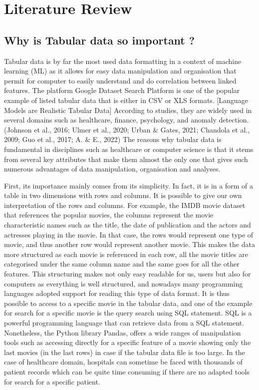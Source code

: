 \chapter{Literature Review}


\section{Why is Tabular data so important ?}

Tabular data is by far the most used data formatting in a context of machine learning (ML) as it allows for easy data manipulation and organisation that permit for computer to easily understand and do correlation between linked features. The platform Google Dataset Search Platform is one of the popular example of listed tabular data that is either in CSV or XLS formats. [Language Models are Realistic Tabular Data] According to studies, they are widely used in several domains such as healthcare, finance, psychology, and anomaly detection. (Johnson et al.,
 2016; Ulmer et al., 2020; Urban \& Gates, 2021; Chandola
 et al., 2009; Guo et al., 2017; A. \& E., 2022) 
The reasons why tabular data is fundamental in disciplines such as healthcare or computer science is that it stems from several key attributes that make them almost the only one that gives such numerous advantages of data manipulation, organisation and analyses. 

First, its importance mainly comes from its simplicity. In fact, it is in a form of a table in two dimensions with rows and columns. It is possible to give our own interpretation of the rows and columns. For example, the IMDB movie dataset that references the popular movies, the columns represent the movie characteristic names such as the title, the date of publication and the actors and actresses playing in the movie. In that case, the rows would represent one type of movie, and thus another row would represent another movie. This makes the data more structured as each movie is referenced in each row, all the movie titles are categorised under the same column name and the same goes for all the other features. This structuring makes not only easy readable for us, users but also for computers as everything is well structured, and nowadays many programming languages adopted support for reading this type of data format. It is thus possible to access to a specific movie in the tabular data, and one of the example for search for a specific movie is the query search using SQL statement. SQL is a powerful programming language that can retrieve data from a SQL statement. Nonetheless, the Python library Pandas, offers a wide ranges of manipulation tools such as accessing directly for a specific feature of a movie showing only the last movies (in the last rows) in case if the tabular data file is too large. In the case of healthcare domain, hospitals can sometime be faced with thousands of patient records which can be quite time consuming if there are no adapted tools for search for a specific patient.

